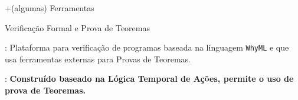 \begin{frame}{+(algumas) Ferramentas}\small
\begin{block}{Verificação Formal e Prova de Teoremas}
      \begin{description}
      \item<1,3>[\href{http://why3.lri.fr/}{Why3}]: Plataforma para
        verificação de programas baseada na linguagem {\tt WhyML} e
        que usa ferramentas externas para Provas de Teoremas.
        \item<2,3>[\href{https://lamport.azurewebsites.net/tla/tla.html}{TLA$^+$}]: {\bf Construído
        baseado na Lógica Temporal de Ações, permite o uso de prova de Teoremas.}
      \end{description}
    \end{block}
\end{frame}
